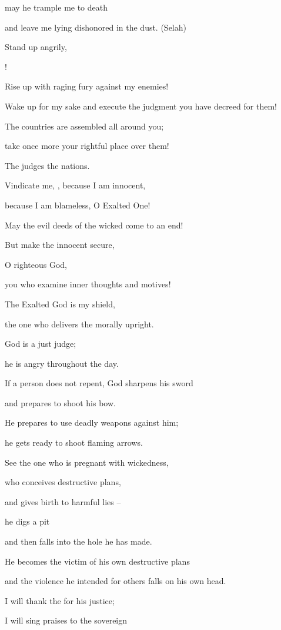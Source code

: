 {\par }{\Q may he trample
me to death

\par }{\Q and leave me lying dishonored
in the dust.
(Selah)
\par }{\Q {}Stand
up angrily,

{}!
\par }{\Q Rise
up with raging fury
against my enemies!

\par }{\Q Wake
up for my sake and execute
the judgment
you have decreed for them!
\par }{\Q {}The countries
are assembled
all around
you;

\par }{\Q take once
more your rightful place over them!
\par }{\Q {}The
{}
judges
the nations.
\par }{\Q Vindicate
me,
{}, because I am innocent,
\par }{\Q because I am blameless, O Exalted One!
\par }{\Q {}May
the evil deeds
of the wicked
come to an end!

\par }{\Q But make the innocent
secure,
\par }{\Q O righteous
God,
\par }{\Q you who examine
inner thoughts
and motives!
\par }{\Q {}The Exalted God
is my
shield,
\par }{\Q the one who delivers
the morally
upright.
\par }{\Q {}God
is a just
judge;
\par }{\Q he
is
angry
throughout
the day.
\par }{\Q {}If
a person does not
repent,
God sharpens his sword
\par }{\Q and prepares
to shoot his bow.
\par }{\Q {}He prepares
to use deadly
weapons
against him;

\par }{\Q he gets
ready to shoot flaming
arrows.
\par }{\Q {}See
the one who is pregnant
with wickedness,
\par }{\Q who conceives
destructive plans,
\par }{\Q and gives birth
to harmful
lies –

\par }{\Q {}he digs
a pit
\par }{\Q and then falls
into the hole
he has made.
\par }{\Q {}He becomes
the victim
of his own destructive plans
\par }{\Q and the violence
he intended for others falls
on
his own head.
\par }{\Q {}I will thank
the {}
for his justice;
\par }{\Q I will sing praises
to the sovereign

}
